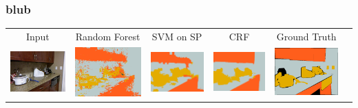 \documentclass[final,ignorenonframetext,compress]{beamer}
\begin{document}
    \begin{frame}
        \frametitle{blub}
        \begin{tabularx}{\linewidth}{@{\extracolsep{\fill}}cccccc}
    \footnotesize Input&
    \footnotesize Random Forest&
    \footnotesize SVM on SP&
    \footnotesize CRF&
    \footnotesize Ground Truth\\

    \includegraphics[width=.17\textwidth]{images/00845_image.png}&%
    \includegraphics[width=.17\linewidth]{images/00845_pixel.png}&%
    \includegraphics[width=.17\linewidth]{images/00845_svm.png}&%
    \includegraphics[width=.17\linewidth]{images/00845_ssvm.png}&%
    \includegraphics[width=.17\linewidth]{images/00845_gt.png}\\


\end{tabularx}
\end{frame}
\end{document}
